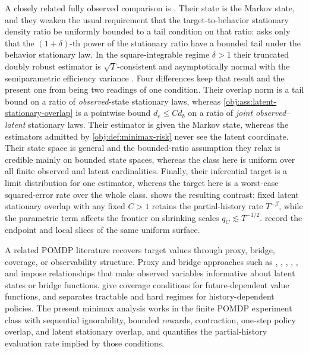 \documentclass[11pt]{article}
\begin{document}
A closely related fully observed comparison is \citet{MehrabiWager2025}. Their state is the Markov state, and they weaken the usual requirement that the target-to-behavior stationary density ratio be uniformly bounded to a tail condition on that ratio: \citet[Definition 1]{MehrabiWager2025} asks only that the \((1+\delta)\)-th power of the stationary ratio have a bounded tail under the behavior stationary law. In the square-integrable regime \(\delta>1\) their truncated doubly robust estimator is \(\sqrt T\)-consistent and asymptotically normal with the semiparametric efficiency variance \citep[Theorem 3.4]{MehrabiWager2025}. Four differences keep that result and the present one from being two readings of one condition. Their overlap norm is a tail bound on a ratio of \emph{observed}-state stationary laws, whereas \cref{obj:ass:latent-stationary-overlap} is a pointwise bound \(d_e\le Cd_b\) on a ratio of \emph{joint observed--latent} stationary laws. Their estimator is given the Markov state, whereas the estimators admitted by \cref{obj:def:minimax-risk} never see the latent coordinate. Their state space is general and the bounded-ratio assumption they relax is credible mainly on bounded state spaces, whereas the class here is uniform over all finite observed and latent cardinalities. Finally, their inferential target is a limit distribution for one estimator, whereas the target here is a worst-case squared-error rate over the whole class.  shows the resulting contrast: fixed latent stationary overlap with any fixed \(C>1\) retains the partial-history rate \(T^{-\beta}\), while the parametric term affects the frontier on shrinking scales \(q_C\lesssim T^{-1/2}\).  record the endpoint and local slices of the same uniform surface.

A related POMDP literature recovers target values through proxy, bridge, coverage, or observability structure. Proxy and bridge approaches such as \citet{TennenholtzShalitMannor2020}, \citet{Bennett2021}, \citet{Miao2022}, \citet{Shi2022}, \citet{Uehara2023}, and \citet{Kuang2025} impose relationships that make observed variables informative about latent states or bridge functions.  give coverage conditions for future-dependent value functions, and \citet{Zhang2025} separates tractable and hard regimes for history-dependent policies. The present minimax analysis works in the finite POMDP experiment class with sequential ignorability, bounded rewards, contraction, one-step policy overlap, and latent stationary overlap, and quantifies the partial-history evaluation rate implied by those conditions.
\end{document}

